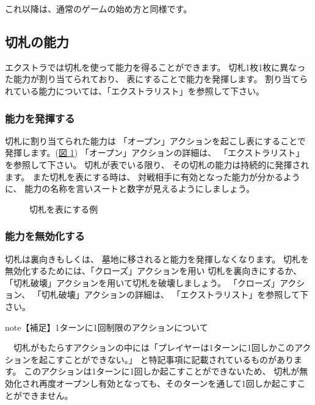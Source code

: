 \documentclass[letterpaper,10pt,dvipdfmx]{sphinxmanual}
\begin{document}
これ以降は、通常のゲームの始め方と同様です。


\subsection{切札の能力}
\label{\detokenize{common/06-extra:id7}}
エクストラでは切札を使って能力を得ることができます。
切札1枚1枚に異なった能力が割り当てられており、
表にすることで能力を発揮します。
割り当てられている能力については、「エクストラリスト」を参照して下さい。


\subsubsection{能力を発揮する}
\label{\detokenize{common/06-extra:id8}}
切札に割り当てられた能力は
「オープン」アクションを起こし表にすることで発揮します。(\hyperref[\detokenize{common/06-extra:trump-open}]{図 \ref{\detokenize{common/06-extra:trump-open}}})
「オープン」アクションの詳細は、
「エクストラリスト」を参照して下さい。
切札が表でいる限り、
その切札の能力は持続的に発揮されます。
また切札を表にする時は、
対戦相手に有効となった能力が分かるように、
能力の名称を言いスートと数字が見えるようにしましょう。

\begin{figure}[htbp]
\centering
\capstart

\noindent{}
\caption{切札を表にする例}\label{\detokenize{common/06-extra:id13}}\label{\detokenize{common/06-extra:trump-open}}\end{figure}


\subsubsection{能力を無効化する}
\label{\detokenize{common/06-extra:id9}}
切札は裏向きもしくは、
墓地に移されると能力を発揮しなくなります。
切札を無効化するためには、「クローズ」アクションを用い
切札を裏向きにするか、
「切札破壊」アクションを用いて切札を破壊しましょう。
「クローズ」アクション、
「切札破壊」アクションの詳細は、
「エクストラリスト」を参照して下さい。

\begin{sphinxadmonition}{note}{【補足】1ターンに1回制限のアクションについて}

　切札がもたらすアクションの中には「プレイヤーは1ターンに1回しかこのアクションを起こすことができない。」
と特記事項に記載されているものがあります。
このアクションは1ターンに1回しか起こすことができないため、
切札が無効化され再度オープンし有効となっても、そのターンを通して1回しか起こすことができません。
\end{sphinxadmonition}
\end{document}
